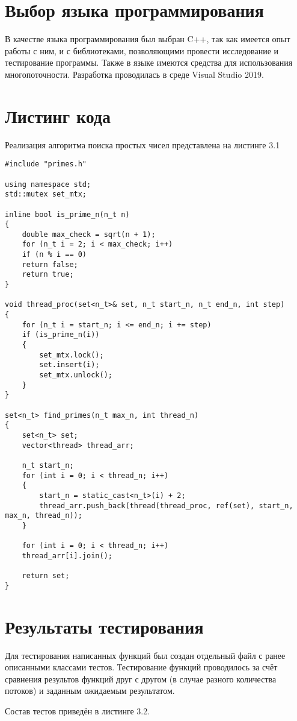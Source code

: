 \section{Выбор языка программирования}
В качестве языка программирования был выбран C++\cite{C++_Doc}, так как имеется опыт работы с ним, и с библиотеками, позволяющими провести исследование и тестирование программы. Также в языке имеются средства для использования многопоточности. Разработка проводилась в среде Visual Studio 2019\cite{VisualStudio}.


\section{Листинг кода}
Реализация алгоритма поиска простых чисел представлена на листинге 3.1

\begin{lstlisting}[caption = Функция параллельного поиска простых чисел.]
#include "primes.h"

using namespace std;
std::mutex set_mtx;

inline bool is_prime_n(n_t n)
{
	double max_check = sqrt(n + 1);
	for (n_t i = 2; i < max_check; i++)
	if (n % i == 0)
	return false;
	return true;
}

void thread_proc(set<n_t>& set, n_t start_n, n_t end_n, int step)
{
	for (n_t i = start_n; i <= end_n; i += step)
	if (is_prime_n(i))
	{
		set_mtx.lock();
		set.insert(i);
		set_mtx.unlock();
	}
}

set<n_t> find_primes(n_t max_n, int thread_n)
{
	set<n_t> set;
	vector<thread> thread_arr;
	
	n_t start_n;
	for (int i = 0; i < thread_n; i++)
	{
		start_n = static_cast<n_t>(i) + 2;
		thread_arr.push_back(thread(thread_proc, ref(set), start_n, max_n, thread_n));
	}
	
	for (int i = 0; i < thread_n; i++)
	thread_arr[i].join();
	
	return set;
}
\end{lstlisting}


\section{Результаты тестирования}
Для тестирования написанных функций был создан отдельный файл с ранее описанными классами тестов. Тестирование функций проводилось за счёт сравнения результов функций друг с другом (в случае разного количества потоков) и заданным ожидаемым результатом.

Состав тестов приведён в листинге 3.2.

